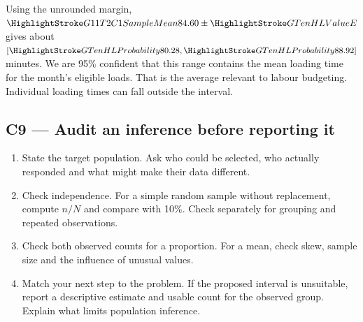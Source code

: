 Using the unrounded margin, \(\SampleMean{84.60}\pm \Margin{E}\) gives about \([\Endpoint{80.28},\Endpoint{88.92}]\) minutes. We are 95\% confident that this range contains the mean loading time for the month's eligible loads. That is the average relevant to labour budgeting. Individual loading times can fall outside the interval.
\par\nobreak
{}

\clearpage
\subsection{C9 --- Audit an inference before reporting it}\label{crit:c9}
\begin{enumerate}
  \item State the target population. Ask who could be selected, who actually responded and what might make their data different.
  \item Check independence. For a simple random sample without replacement, compute \(n/N\) and compare with 10\%. Check separately for grouping and repeated observations.
  \item Check both observed counts for a proportion. For a mean, check skew, sample size and the influence of unusual values.
  \item Match your next step to the problem. If the proposed interval is unsuitable, report a descriptive estimate and usable count for the observed group. Explain what limits population inference.
\end{enumerate}

